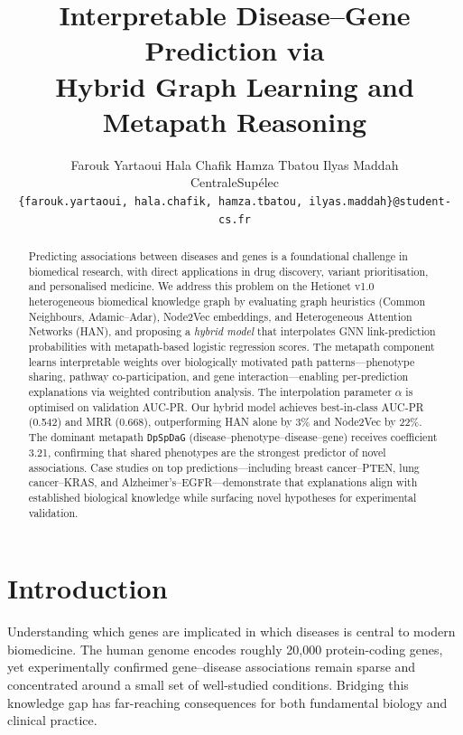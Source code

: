 \documentclass{article}
\title{Interpretable Disease--Gene Prediction via\\Hybrid Graph Learning and Metapath Reasoning}
\author{
Farouk Yartaoui \quad Hala Chafik \quad Hamza Tbatou \quad Ilyas Maddah\\
CentraleSup\'elec\\
\texttt{\{farouk.yartaoui, hala.chafik, hamza.tbatou, ilyas.maddah\}@student-cs.fr}
}
\begin{document}
\maketitle

\begin{abstract}
Predicting associations between diseases and genes is a foundational challenge in biomedical research, with direct applications in drug discovery, variant prioritisation, and personalised medicine. We address this problem on the Hetionet v1.0 heterogeneous biomedical knowledge graph by evaluating graph heuristics (Common Neighbours, Adamic--Adar), Node2Vec embeddings, and Heterogeneous Attention Networks (HAN), and proposing a \emph{hybrid model} that interpolates GNN link-prediction probabilities with metapath-based logistic regression scores. The metapath component learns interpretable weights over biologically motivated path patterns---phenotype sharing, pathway co-participation, and gene interaction---enabling per-prediction explanations via weighted contribution analysis. The interpolation parameter $\alpha$ is optimised on validation AUC-PR. Our hybrid model achieves best-in-class AUC-PR (0.542) and MRR (0.668), outperforming HAN alone by 3\% and Node2Vec by 22\%. The dominant metapath \texttt{DpSpDaG} (disease--phenotype--disease--gene) receives coefficient 3.21, confirming that shared phenotypes are the strongest predictor of novel associations. Case studies on top predictions---including breast cancer--PTEN, lung cancer--KRAS, and Alzheimer's--EGFR---demonstrate that explanations align with established biological knowledge while surfacing novel hypotheses for experimental validation.
\end{abstract}

\section{Introduction}
\label{sec:intro}

Understanding which genes are implicated in which diseases is central to modern biomedicine. The human genome encodes roughly 20,000 protein-coding genes, yet experimentally confirmed gene--disease associations remain sparse and concentrated around a small set of well-studied conditions. Bridging this knowledge gap has far-reaching consequences for both fundamental biology and clinical practice.
\end{document}

